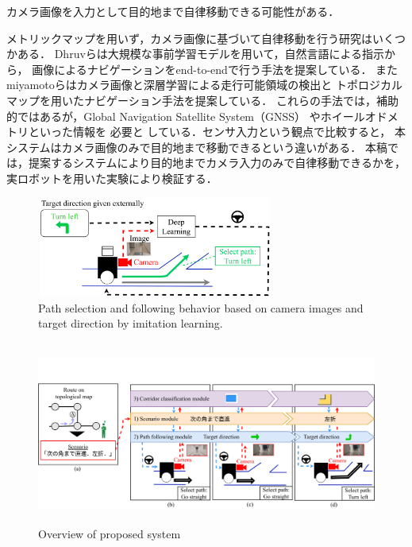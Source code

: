 \documentclass{sice-si}
\begin{document}
カメラ画像を入力として目的地まで自律移動できる可能性がある．
\par
メトリックマップを用いず，カメラ画像に基づいて自律移動を行う研究はいくつかある．
Dhruvら\cite{shah2022lmnav}は大規模な事前学習モデルを用いて，自然言語による指示から，
画像によるナビゲーションをend-to-endで行う手法を提案している．
またmiyamotoら\cite{seg_meizi}はカメラ画像と深層学習による走行可能領域の検出と
トポロジカルマップを用いたナビゲーション手法を提案している．
これらの手法では，補助的ではあるが，Global Navigation Satellite System（GNSS）
やホイールオドメトリといった情報を
必要と
している．センサ入力という観点で比較すると，
本システムはカメラ画像のみで目的地まで移動できるという違いがある．
本稿では，提案するシステムにより目的地までカメラ入力のみで自律移動できるかを，
実ロボットを用いた実験により検証する．
\begin{figure}[h]
    \centering
     \includegraphics[height=33mm,width=78mm]{./figs/camera_base.pdf}
     \caption{Path selection and following behavior based on camera images and
     target direction by imitation learning.}\label{fig:camera_base}
\end{figure}
\begin{figure}[t]
    \centering
     \includegraphics[height=60mm,width=160mm]{./figs/absv3.pdf}
     \caption{Overview of proposed system}\label{fig:system}
\end{figure}
\end{document}
